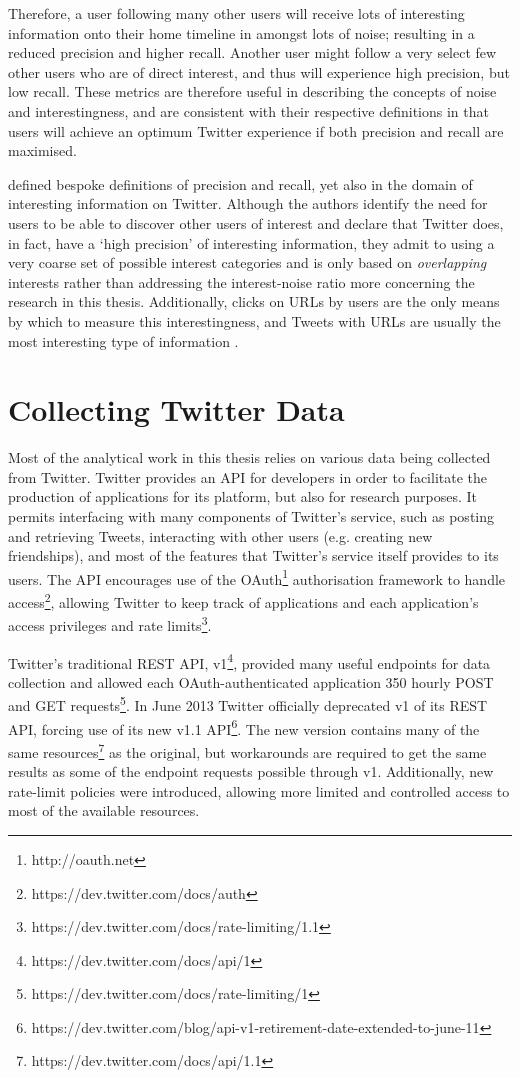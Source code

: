 Therefore, a user following many other users will receive lots of interesting information onto their home timeline in amongst lots of noise; resulting in a reduced precision and higher recall. Another user might follow a very select few other users who are of direct interest, and thus will experience high precision, but low recall. These metrics are therefore useful in describing the concepts of noise and interestingness, and are consistent with their respective definitions in that users will achieve an optimum Twitter experience if both precision and recall are maximised.

\citet{zadeh13} defined bespoke definitions of precision and recall, yet also in the domain of interesting information on Twitter. Although the authors identify the need for users to be able to discover other users of interest and declare that Twitter does, in fact, have a `high precision' of interesting information, they admit to using a very coarse set of possible interest categories and is only based on \textit{overlapping} interests rather than addressing the interest-noise ratio more concerning the research in this thesis. Additionally, clicks on URLs by users are the only means by which to measure this interestingness, and Tweets with URLs are usually the most interesting type of information \cite{alonso10}.



\section{Collecting Twitter Data}
Most of the analytical work in this thesis relies on various data being collected from Twitter. Twitter provides an API for developers in order to facilitate the production of applications for its platform, but also for research purposes. It permits interfacing with many components of Twitter's service, such as posting and retrieving Tweets, interacting with other users (e.g. creating new friendships), and most of the features that Twitter's service itself provides to its users. The API encourages use of the OAuth\footnote{http://oauth.net} authorisation framework to handle access\footnote{https://dev.twitter.com/docs/auth}, allowing Twitter to keep track of applications and each application's access privileges and rate limits\footnote{https://dev.twitter.com/docs/rate-limiting/1.1}.

Twitter's traditional REST API, v1\footnote{https://dev.twitter.com/docs/api/1}, provided many useful endpoints for data collection and allowed each OAuth-authenticated application 350 hourly POST and GET requests\footnote{https://dev.twitter.com/docs/rate-limiting/1}. In June 2013 Twitter officially deprecated v1 of its REST API, forcing use of its new v1.1 API\footnote{https://dev.twitter.com/blog/api-v1-retirement-date-extended-to-june-11}. The new version contains many of the same resources\footnote{https://dev.twitter.com/docs/api/1.1} as the original, but workarounds are required to get the same results as some of the endpoint requests possible through v1. Additionally, new rate-limit policies were introduced, allowing more limited and controlled access to most of the available resources.

